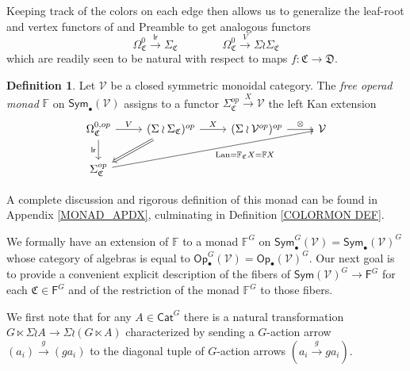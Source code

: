 \documentclass[a4paper,10pt
,draft
]{article}%
\numberwithin{equation}{section}
\numberwithin{figure}{section}
\theoremstyle{definition} %
\newtheorem{definition}[equation]{Definition}%
\newcommand{\Sym}{\ensuremath{\mathsf{Sym}}}%
\newcommand{\Op}{\mathsf{Op}}%
\DeclareMathOperator{\Lan}{Lan}%
\newcommand{\V}{\ensuremath{\mathcal V}}
\newcommand{\1}{\ensuremath{\mathbbm 1}}%
\begin{document}
Keeping track of the colors on each edge then allows us to generalize the leaf-root and vertex functors of 
\cite{BP_geo} {\color{red} and Preamble} to get analogous functors
\[
\Omega_{\mathfrak{C}}^0 \xrightarrow{\mathsf{lr}} \Sigma_{\mathfrak{C}}
\qquad \qquad
\Omega_{\mathfrak{C}}^0 \xrightarrow{V} \Sigma \wr \Sigma_{\mathfrak{C}}
\]
which are readily seen to be natural with respect to maps 
$f \colon \mathfrak{C} \to \mathfrak{D}$.

\begin{definition}
      Let $\mathcal{V}$ be a closed symmetric monoidal category.
      The \textit{free operad monad} $\mathbb{F}$ on $\mathsf{Sym}_\bullet(\mathcal{V})$ 
      assigns to a functor
      $\Sigma_{\mathfrak{C}}^{op} \xrightarrow{X} \mathcal{V}$
      the left Kan extension
      \begin{equation}
            \label{FREEOP_EQ}
            \begin{tikzcd}
                  \Omega^{0,op}_{\mathfrak{C}}
                  \arrow[d, "\mathsf{lr}"']
                  \arrow[r, "V"]
                  &
                  (\Sigma \wr \Sigma_{\mathfrak{C}})^{op} \arrow[r, "X"]
                  \arrow[dl, Rightarrow]
                  &
                  (\Sigma \wr \V^{op})^{op} \arrow[r, "\otimes"]
                  &
                  \V
                  \\
                  \Sigma^{op}_{\mathfrak{C}} \arrow[urrr, "\Lan = \mathbb F_{\mathfrak{C}} X = \mathbb F X"']
            \end{tikzcd}
      \end{equation}
\end{definition}

A complete discussion and rigorous definition of this monad can be found in Appendix \ref{MONAD_APDX},
culminating in Definition \ref{COLORMON DEF}.

We formally have an extension of $\mathbb F$ to a monad $\mathbb F^G$ on $\Sym^G_\bullet(\V) = \Sym_\bullet(\V)^G$
whose category of algebras is equal to $\Op^G_\bullet(\V) = \Op_\bullet(\V)^G$.
Our next goal is to provide a convenient explicit description of the fibers of $\mathsf{Sym}(\mathcal{V})^G \to \mathsf{F}^G$
for each $\mathfrak{C} \in \mathsf{F}^G$
and of the restriction of the monad $\mathbb{F}^G$ to those fibers.

We first note that for any 
$A \in \mathsf{Cat}^G$ there is a natural transformation
$G \ltimes \Sigma \wr A \to \Sigma \wr (G \ltimes A)$
characterized by sending a $G$-action arrow 
$(a_i) \xrightarrow{g} (g a_i)$
to the diagonal tuple of $G$-action arrows
$(a_i \xrightarrow{g} g a_i)$.
\end{document}
